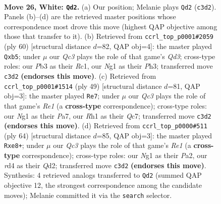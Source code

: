 \documentclass[11pt]{article}
\begin{document}
\clearpage

\begin{figure}[p]\centering
\begin{subfigure}{0.46\textwidth}\centering
\resizebox{\linewidth}{!}{%
\newchessgame
\chessboard[
  setfen={r1b2k2/pp3pp1/n3p3/3p4/3r4/PPQ5/2K2qPP/R5NR w - - 2 26},
  showmover=false,
  pgfstyle=straightmove, color=movearrow, markmove={c3-d2}
]}
\caption{}
\end{subfigure}\hfill
\begin{subfigure}{0.46\textwidth}\centering
\resizebox{\linewidth}{!}{%
\newchessgame
\chessboard[
  setfen={5rk1/1p4p1/1b2pq1p/pr2N3/3P1P2/P2Q3P/7K/2R1R3 w - - 0 31},
  showmover=false,
  pgfstyle=straightmove, color=movearrow, markmove={d3-b5}
]}
\caption{}
\end{subfigure}
\\[4pt]
\begin{subfigure}{0.46\textwidth}\centering
\resizebox{\linewidth}{!}{%
\newchessgame
\chessboard[
  setfen={4r1k1/ppq2ppp/3rn3/1Q6/1P5P/P4RP1/5PK1/2B2R2 b - - 4 25},
  showmover=false,
  pgfstyle=straightmove, color=movearrow, markmove={e8-e7}
]}
\caption{}
\end{subfigure}\hfill
\begin{subfigure}{0.46\textwidth}\centering
\resizebox{\linewidth}{!}{%
\newchessgame
\chessboard[
  setfen={4r1k1/pppb1r1p/3q3P/3p1p2/3P1Np1/6P1/PP1Q4/1K2R2R w - - 1 33},
  showmover=false,
  pgfstyle=straightmove, color=movearrow, markmove={e1-e8}
]}
\caption{}
\end{subfigure}
\caption{\textbf{Move 26, White: \texttt{Qd2}.} (a) Our position; Melanie plays \texttt{Qd2} (\texttt{c3d2}). Panels (b)--(d) are the retrieved master positions whose correspondence most drove this move (highest QAP objective among those that transfer to it). (b) Retrieved from \texttt{ccrl\_top\_p0001\#2059} (ply 60) [structural distance $d$=82, QAP obj=4]: the master played \texttt{Qxb5}; under $\mu$ our \emph{Qc3} plays the role of that game's \emph{Qd3}; cross-type roles: our \emph{P}b3 as their \emph{R}c1, our \emph{N}g1 as their \emph{P}h3; transferred move \texttt{c3d2} \textbf{(endorses this move)}. (c) Retrieved from \texttt{ccrl\_top\_p0001\#1514} (ply 49) [structural distance $d$=81, QAP obj=3]: the master played \texttt{Re7}; under $\mu$ our \emph{Qc3} plays the role of that game's \emph{Re1} (a \textbf{cross-type} correspondence); cross-type roles: our \emph{N}g1 as their \emph{P}a7, our \emph{R}h1 as their \emph{Q}c7; transferred move \texttt{c3d2} \textbf{(endorses this move)}. (d) Retrieved from \texttt{ccrl\_top\_p0000\#511} (ply 64) [structural distance $d$=85, QAP obj=3]: the master played \texttt{Rxe8+}; under $\mu$ our \emph{Qc3} plays the role of that game's \emph{Re1} (a \textbf{cross-type} correspondence); cross-type roles: our \emph{N}g1 as their \emph{P}a2, our \emph{r}d4 as their \emph{Q}d2; transferred move \texttt{c3d2} \textbf{(endorses this move)}. Synthesis: 4 retrieved analogs transferred to \texttt{Qd2} (summed QAP objective 12, the strongest correspondence among the candidate moves); Melanie committed it via the \texttt{search} selector.}
\label{fig:thought-m50}
\end{figure}
\end{document}
